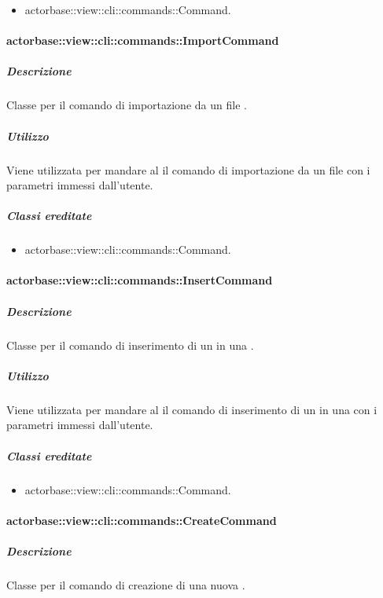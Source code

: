 \documentclass{scalatekids-article}
\begin{document}
\begin{itemize}
\item actorbase::view::cli::commands::Command.
\end{itemize}

\paragraph{actorbase::view::cli::commands::ImportCommand}

\subparagraph{Descrizione}

Classe per il comando di importazione da un file .

\subparagraph{Utilizzo}

Viene utilizzata per mandare al  il comando di importazione
da un file  con i parametri immessi dall'utente.

\subparagraph{Classi ereditate}

\begin{itemize}
\item actorbase::view::cli::commands::Command.
\end{itemize}

\paragraph{actorbase::view::cli::commands::InsertCommand}

\subparagraph{Descrizione}

Classe per il comando di inserimento di un  in una
.

\subparagraph{Utilizzo}

Viene utilizzata per mandare al  il comando di inserimento
di un  in una  con i parametri immessi
dall'utente.

\subparagraph{Classi ereditate}

\begin{itemize}
\item actorbase::view::cli::commands::Command.
\end{itemize}

\paragraph{actorbase::view::cli::commands::CreateCommand}

\subparagraph{Descrizione}

Classe per il comando di creazione di una nuova .
\end{document}
